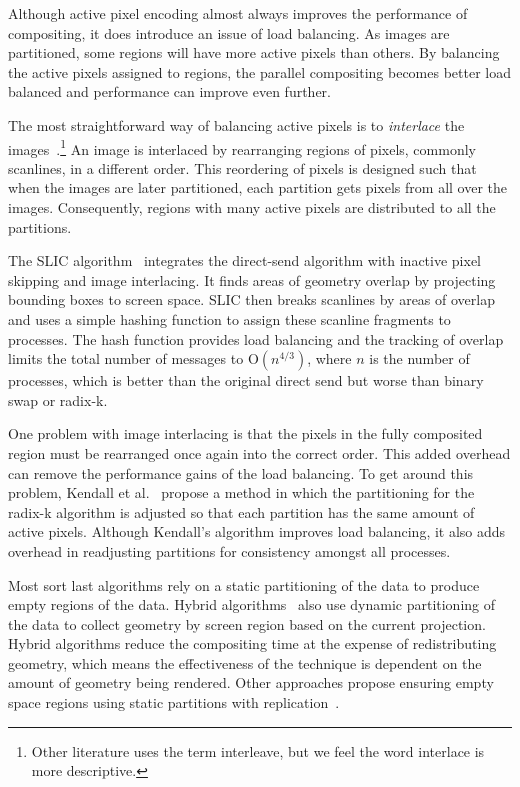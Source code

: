 \documentclass{acm_proc_article-sp}
\newcommand*{\lcite}[1]{~\cite{#1}}
\newcommand*{\scite}[1]{~\cite{#1}}
\newcommand{\etal}{et al.}
\newcommand*{\keyterm}[1]{\emph{#1}}
\newcommand{\Oh}{\mathrm{O}}
\begin{document}
Although active pixel encoding almost always improves the performance of
compositing, it does introduce an issue of load balancing.  As images are
partitioned, some regions will have more active pixels than others.  By
balancing the active pixels assigned to regions, the parallel compositing
becomes better load balanced and performance can improve even further.

The most straightforward way of balancing active pixels is to
\keyterm{interlace} the
images\lcite{Molnar1994,Takeuchi2003}.\footnote{Other literature uses the
  term interleave, but we feel the word interlace is more descriptive.}  An
image is interlaced by rearranging regions of pixels, commonly scanlines,
in a different order.  This reordering of pixels is designed such that when
the images are later partitioned, each partition gets pixels from all over
the images.  Consequently, regions with many active pixels are distributed
to all the partitions.

The SLIC algorithm\lcite{SLIC} integrates the direct-send algorithm with
inactive pixel skipping and image interlacing.  It finds areas of geometry
overlap by projecting bounding boxes to screen space.  SLIC then breaks
scanlines by areas of overlap and uses a simple hashing function to assign
these scanline fragments to processes.  The hash function provides load
balancing and the tracking of overlap limits the total number of messages
to $\Oh(n^{4/3})$, where $n$ is the number of processes, which is better
than the original direct send but worse than binary swap or radix-k.

One problem with image interlacing is that the pixels in the fully
composited region must be rearranged once again into the correct order.
This added overhead can remove the performance gains of the load balancing.
To get around this problem, Kendall \etal\scite{Kendall2010} propose a
method in which the partitioning for the radix-k algorithm is adjusted so
that each partition has the same amount of active pixels.  Although
Kendall's algorithm improves load balancing, it also adds overhead in
readjusting partitions for consistency amongst all processes.

Most sort last algorithms rely on a static partitioning of the data to
produce empty regions of the data.  Hybrid algorithms\lcite{Samanta2000}
also use dynamic partitioning of the data to collect geometry by screen
region based on the current projection.  Hybrid algorithms reduce the
compositing time at the expense of redistributing geometry, which means the
effectiveness of the technique is dependent on the amount of geometry being
rendered.  Other approaches propose ensuring empty space regions using
static partitions with replication\lcite{Samanta2001}.
\end{document}
